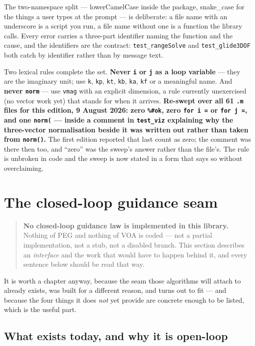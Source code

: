 \documentclass[11pt]{article}
\newcommand{\code}[1]{\texttt{#1}}
\begin{document}
The two-namespace split --- lowerCamelCase inside the package, snake\_case for
the things a user types at the prompt --- is deliberate: a file name with an
underscore is a script you run, a file name without one is a function the
library calls. Every error carries a three-part identifier naming the function
and the cause, and the identifiers are the contract: \code{test\_rangeSolve}
and \code{test\_glide3DOF} both catch by identifier rather than by message text.

Two lexical rules complete the set. \textbf{Never \code{i} or \code{j} as a
loop variable} --- they are the imaginary unit; use \code{k}, \code{kp},
\code{kt}, \code{kb}, \code{ka}, \code{kf} or a meaningful name. And
\textbf{never \code{norm}} --- use \code{vmag} with an explicit dimension,
a rule currently unexercised (no vector work yet) that stands for when it
arrives. \textbf{Re-swept over all 61 \code{.m} files for this edition,
9 August 2026: zero \code{\%\#ok}, zero \code{for i =} or \code{for j =}, and
one \code{norm(} --- inside a comment in \code{test\_viz} explaining why the
three-vector normalisation beside it was written out rather than taken from
\code{norm()}.} The first edition reported that last count as zero; the
comment was there then too, and ``zero'' was the sweep's answer rather than
the file's. The rule is unbroken in code and the sweep is now stated in a form
that says so without overclaiming.

\section{The closed-loop guidance seam}
\label{sec:seam}

\begin{quote}
\textbf{No closed-loop guidance law is implemented in this library.} Nothing of
PEG and nothing of VOA is coded --- not a partial implementation, not a stub,
not a disabled branch. This section describes an \emph{interface} and the work
that would have to happen behind it, and every sentence below should be read
that way.
\end{quote}

It is worth a chapter anyway, because the seam those algorithms will attach to
already exists, was built for a different reason, and turns out to fit --- and
because the four things it does \emph{not} yet provide are concrete enough to
be listed, which is the useful part.

\subsection{What exists today, and why it is open-loop}
\end{document}
